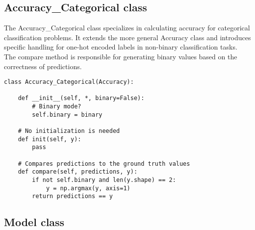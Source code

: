 \documentclass{article}
\begin{document}
\subsection{Accuracy\_Categorical class}
The Accuracy\_Categorical class specializes in calculating accuracy for categorical classification problems. It extends the more general Accuracy class and introduces specific handling for one-hot encoded labels in non-binary classification tasks. The compare method is responsible for generating binary values based on the correctness of predictions.

\begin{lstlisting}
class Accuracy_Categorical(Accuracy):

    def __init__(self, *, binary=False):
        # Binary mode?
        self.binary = binary

    # No initialization is needed
    def init(self, y):
        pass

    # Compares predictions to the ground truth values
    def compare(self, predictions, y):
        if not self.binary and len(y.shape) == 2:
            y = np.argmax(y, axis=1)
        return predictions == y

\end{lstlisting}

\subsection{Model class}
\end{document}
